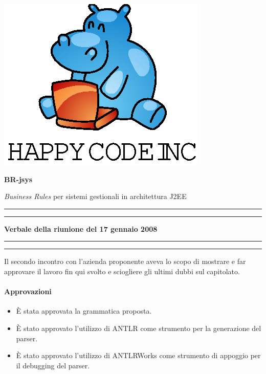 \documentclass[11pt,titlepage,a4paper]{report}
\begin{document}
\begin{titlepage}
\begin{center}
\vspace*{0.5in}
\includegraphics{logo.eps}
\vspace*{0.2in}

{\Large \textbf{BR-jsys}}

{\Large \emph{Business Rules} per sistemi gestionali in architettura J2EE } 
\vspace{1.3in}
\par\rule{10cm}{.4pt} \par
\par\rule{12cm}{1pt} \par
\vspace*{0.5in}
\LARGE \textbf {Verbale della riunione del 17 gennaio 2008}
\vspace*{0.5in}
\par\rule{12cm}{1pt} \par
\par\rule{10cm}{.4pt} \par

\end{center}
\end{titlepage}
\vspace*{0.5in}

\thispagestyle{plain}
Il secondo incontro con l'azienda proponente aveva lo scopo di mostrare e far approvare il lavoro fin qui svolto e sciogliere gli ultimi dubbi sul capitolato.

\paragraph{Approvazioni}
\begin{itemize}

\item \`E stata approvata la grammatica proposta.
\item \`E stato approvato l'utilizzo di ANTLR come strumento per la generazione del parser.
\item \`E stato approvato l'utilizzo di ANTLRWorks come strumento di appoggio per il debugging del parser.

\end{itemize}
\end{document}

